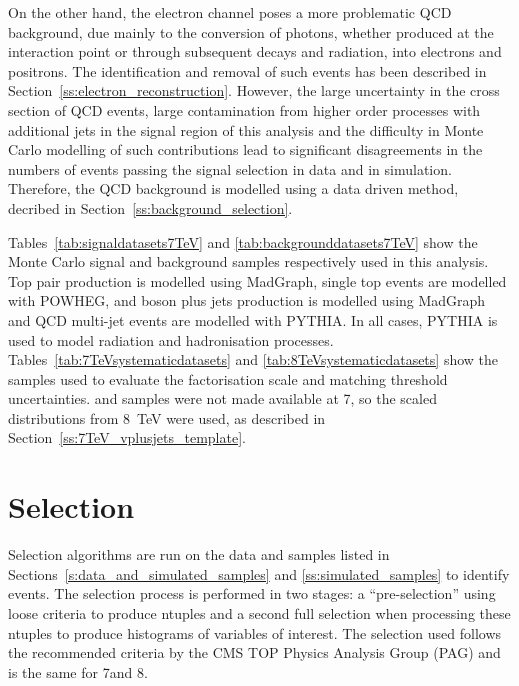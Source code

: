 On the other hand, the electron channel poses a more problematic QCD background, due mainly to the conversion
of photons, whether produced at the interaction point or through subsequent decays and radiation, into
electrons and positrons. The identification and removal of such events has been described in
Section~\ref{ss:electron_reconstruction}. However, the large uncertainty in the cross section of QCD events,
large contamination from higher order processes with additional jets in the signal region of this analysis and
the difficulty in Monte Carlo modelling of such contributions lead to significant disagreements in the numbers
of events passing the signal selection in data and in simulation. Therefore, the QCD background is
modelled using a data driven method, decribed in Section~\ref{ss:background_selection}.

Tables~\ref{tab:signaldatasets7TeV} and \ref{tab:backgrounddatasets7TeV} show the Monte Carlo signal and
background samples respectively used in this analysis. Top pair production is modelled using MadGraph, single
top events are modelled with POWHEG, \W and \Z boson plus jets production is modelled using MadGraph and QCD
multi-jet events are modelled with PYTHIA. In all cases, PYTHIA is used to model radiation and hadronisation
processes. Tables~\ref{tab:7TeVsystematicdatasets} and \ref{tab:8TeVsystematicdatasets} show the samples used
to evaluate the factorisation scale and matching threshold uncertainties. \WpJets and \ZpJets samples were not made available at 7\TeV, so the
scaled distributions from \SI{8}{\TeV} were used, as described in Section~\ref{ss:7TeV_vplusjets_template}.








\section{Selection}
\label{s:selection}
Selection algorithms are run on the data and samples listed in Sections~\ref{s:data_and_simulated_samples} and
\ref{ss:simulated_samples} to identify \ttbar events. The selection process is performed in two stages: a
``pre-selection'' using loose criteria to produce ntuples and a second full selection when processing these
ntuples to produce histograms of variables of interest. The selection used follows the recommended criteria by
the CMS TOP Physics Analysis Group (PAG) and is the same for 7\TeV and 8\TeV.

